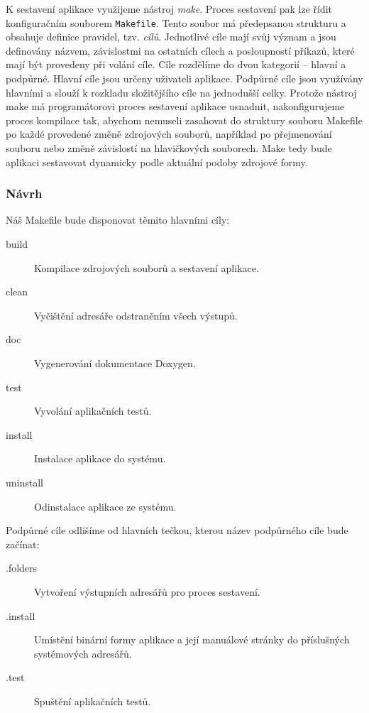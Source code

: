 \documentclass[thesis=B,czech,hidelinks]{FITthesis}[2012/06/26]
\begin{document}
K sestavení aplikace využijeme nástroj \emph{make}. Proces sestavení pak lze řídit konfiguračním souborem \texttt{Makefile}. Tento soubor má předepsanou strukturu a obsahuje definice pravidel, tzv. \emph{cílů}. Jednotlivé cíle mají svůj význam a jsou definovány názvem, závislostmi na ostatních cílech a posloupností příkazů, které mají být provedeny při volání cíle. Cíle rozdělíme do dvou kategorií -- hlavní a podpůrné. Hlavní cíle jsou určeny uživateli aplikace. Podpůrné cíle jsou využívány hlavními a slouží k rozkladu složitějšího cíle na jednodušší celky. Protože nástroj make má programátorovi proces sestavení aplikace usnadnit, nakonfigurujeme proces kompilace tak, abychom nemuseli zasahovat do struktury souboru Makefile po každé provedené změně zdrojových souborů, například po přejmenování souboru nebo změně závislostí na hlavičkových souborech. Make tedy bude aplikaci sestavovat dynamicky podle aktuální podoby zdrojové formy.

\subsubsection{Návrh}

Náš Makefile bude disponovat těmito hlavními cíly:

\begin{description}
	\item[build] Kompilace zdrojových souborů a sestavení aplikace.
	\item[clean] Vyčištění adresáře odstraněním všech výstupů.
	\item[doc] Vygenerování dokumentace Doxygen.
	\item[test] Vyvolání aplikačních testů.
	\item[install] Instalace aplikace do systému.
	\item[uninstall] Odinstalace aplikace ze systému.
\end{description}

Podpůrné cíle odlišíme od hlavních tečkou, kterou název podpůrného cíle bude začínat:

\begin{description}
	\item[.folders] Vytvoření výstupních adresářů pro proces sestavení.
	\item[.install] Umístění binární formy aplikace a její manuálové stránky do příslušných systémových adresářů.
	\item[.test] Spuštění aplikačních testů.
\end{description}
\end{document}
